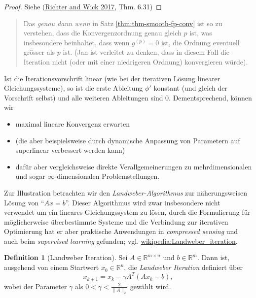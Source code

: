 \documentclass[
]{book}
\providecommand{\tightlist}{%
  \setlength{\itemsep}{0pt}\setlength{\parskip}{0pt}}
\newenvironment {JHSAYS} [0] {\begin{quote}\color{jhsc}} {\end{quote}}
\theoremstyle{definition}
\newtheorem{definition}{Definition}[chapter]
\theoremstyle{definition}
\theoremstyle{definition}
\theoremstyle{definition}
\theoremstyle{remark}
\begin{document}
\begin{proof}
Siehe (\protect\hyperlink{ref-RicW17}{Richter and Wick 2017}, Thm. 6.31)
\end{proof}

\leavevmode{}%
\begin{JHSAYS}
Das \emph{genau dann wenn} in Satz \ref{thm:thm-smooth-fp-conv} ist so zu verstehen, dass die Konvergenzordnung genau gleich \(p\) ist, was insbesondere beinhaltet, dass wenn \(g^{(p)}=0\) ist, die Ordnung eventuell grösser als \(p\) ist. (Jan ist verleitet zu denken, dass in diesem Fall die Iteration nicht (oder mit einer niedrigeren Ordnung) konvergieren würde).

\end{JHSAYS}

Ist die Iterationsvorschrift linear (wie bei der iterativen Lösung linearer Gleichungssysteme), so ist die erste Ableitung \(\phi'\) konstant (und gleich der Vorschrift selbst) und alle weiteren Ableitungen sind \(0\). Dementsprechend, können wir

\begin{itemize}
\tightlist
\item
  maximal lineare Konvergenz erwarten
\item
  (die aber beispielsweise durch dynamische Anpassung von Parametern auf superlinear verbessert werden kann)
\item
  dafür aber vergleichsweise direkte Verallgemeinerungen zu mehrdimensionalen und sogar \(\infty\)-dimensionalen Problemstellungen.
\end{itemize}

Zur Illustration betrachten wir den \emph{Landweber-Algorithmus} zur näherungsweisen Lösung von ``\(Ax=b\)''.
Dieser Algorithmus wird zwar insbesondere nicht verwendet um ein lineares Gleichungssystem zu lösen, durch die Formulierung für möglicherweise überbestimmte Systeme und die Verbindung zur iterativen Optimierung hat er aber praktische Anwendungen in \emph{compressed sensing} und auch beim \emph{supervised learning} gefunden; vgl. \href{https://en.wikipedia.org/wiki/Landweber_iteration}{wikipedia:Landweber\_iteration}.

\begin{definition}[Landweber Iteration]
\protect\hypertarget{def:def-landweber-alg}{}\label{def:def-landweber-alg}Sei \(A\in \mathbb R^{m\times n}\) und \(b\in \mathbb R^{m}\). Dann ist, ausgehend von einem Startwert \(x_0 \in \mathbb R^{n}\), die \emph{Landweber Iteration} definiert über
\begin{equation*}
x_{k+1} = x_k - \gamma A^T(Ax_k -b ),
\end{equation*}
wobei der Parameter \(\gamma\) als \(0<\gamma< \frac{2}{\|A\|_2}\) gewählt wird.
\end{definition}
\end{document}

